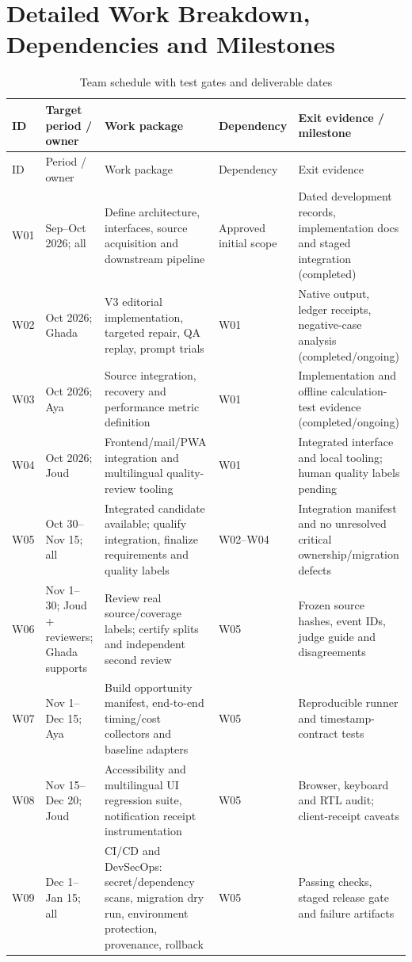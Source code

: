 \section{Detailed Work Breakdown, Dependencies and Milestones}
\small
\begin{longtable}{L{1.1cm}L{2.45cm}L{3.95cm}L{2.2cm}L{3.1cm}}
\caption{Team schedule with test gates and deliverable dates}\label{tab:schedule}\\\toprule ID & Target period / owner & Work package & Dependency & Exit evidence / milestone \\ \midrule\endfirsthead\toprule ID & Period / owner & Work package & Dependency & Exit evidence \\ \midrule\endhead
W01 & Sep--Oct 2026; all & Define architecture, interfaces, source acquisition and downstream pipeline & Approved initial scope & Dated development records, implementation docs and staged integration (completed) \\
W02 & Oct 2026; Ghada & V3 editorial implementation, targeted repair, QA replay, prompt trials & W01 & Native output, ledger receipts, negative-case analysis (completed/ongoing) \\
W03 & Oct 2026; Aya & Source integration, recovery and performance metric definition & W01 & Implementation and offline calculation-test evidence (completed/ongoing) \\
W04 & Oct 2026; Joud & Frontend/mail/PWA integration and multilingual quality-review tooling & W01 & Integrated interface and local tooling; human quality labels pending \\
W05 & Oct 30--Nov 15; all & Integrated candidate available; qualify integration, finalize requirements and quality labels & W02--W04 & Integration manifest and no unresolved critical ownership/migration defects \\
W06 & Nov 1--30; Joud + reviewers; Ghada supports & Review real source/coverage labels; certify splits and independent second review & W05 & Frozen source hashes, event IDs, judge guide and disagreements \\
W07 & Nov 1--Dec 15; Aya & Build opportunity manifest, end-to-end timing/cost collectors and baseline adapters & W05 & Reproducible runner and timestamp-contract tests \\
W08 & Nov 15--Dec 20; Joud & Accessibility and multilingual UI regression suite, notification receipt instrumentation & W05 & Browser, keyboard and RTL audit; client-receipt caveats \\
W09 & Dec 1--Jan 15; all & CI/CD and DevSecOps: secret/dependency scans, migration dry run, environment protection, provenance, rollback & W05 & Passing checks, staged release gate and failure artifacts \\

\end{longtable}
